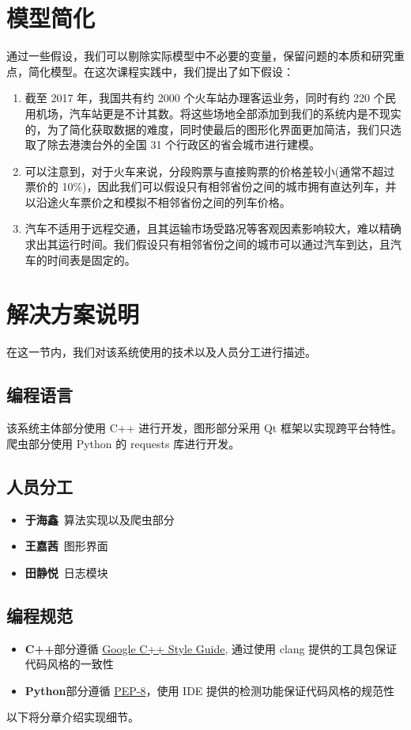 \documentclass[lang=cn,blue]{elegantbook}
\begin{document}
\section{模型简化}
通过一些假设，我们可以剔除实际模型中不必要的变量，保留问题的本质和研究重点，简化模型。在这次课程实践中，我们提出了如下假设：
\begin{enumerate}
	\item 截至 2017 年，我国共有约 2000 个火车站办理客运业务，同时有约 220 个民用机场，汽车站更是不计其数。将这些场地全部添加到我们的系统内是不现实的，为了简化获取数据的难度，同时使最后的图形化界面更加简洁，我们只选取了除去港澳台外的全国 31 个行政区的省会城市进行建模。
	\item 可以注意到，对于火车来说，分段购票与直接购票的价格差较小(通常不超过票价的 10\%)，因此我们可以假设只有相邻省份之间的城市拥有直达列车，并以沿途火车票价之和模拟不相邻省份之间的列车价格。
	\item 汽车不适用于远程交通，且其运输市场受路况等客观因素影响较大，难以精确求出其运行时间。我们假设只有相邻省份之间的城市可以通过汽车到达，且汽车的时间表是固定的。
\end{enumerate}

\section{解决方案说明}
在这一节内，我们对该系统使用的技术以及人员分工进行描述。
\subsection{编程语言}
该系统主体部分使用 C++ 进行开发，图形部分采用 Qt 框架以实现跨平台特性。爬虫部分使用 Python 的 requests 库进行开发。
\subsection{人员分工}
\begin{itemize}
	\item \textbf{于海鑫}\ 算法实现以及爬虫部分
	\item \textbf{王嘉茜}\ 图形界面
	\item \textbf{田静悦}\ 日志模块
\end{itemize}
\subsection{编程规范}
\begin{itemize}
	\item \textbf{C++}部分遵循 \href{http://www.nscscc.org/uploads/soft/170318/1-1F31P20H9.docxhttp://google.github.io/styleguide/cppguide}{Google C++ Style Guide}, 通过使用 clang 提供的工具包保证代码风格的一致性
	\item \textbf{Python}部分遵循 \href{https://www.python.org/dev/peps/pep-0008/}{PEP-8}，使用 IDE 提供的检测功能保证代码风格的规范性
\end{itemize}
\vspace*{3 ex}
以下将分章介绍实现细节。
\end{document}
